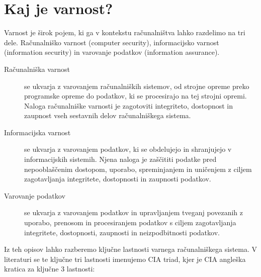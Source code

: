 \documentclass[12pt,a4paper,openany,tikz]{book}
\theoremstyle{plain}
\theoremstyle{definition}
\begin{document}
\section{Kaj je varnost?}
\label{sec:Kaj je varnost?}


Varnost je širok pojem, ki ga v kontekstu računalništva lahko razdelimo na tri dele. Računalniško varnost (computer security), informacijsko varnost (information security) in varovanje podatkov (information assurance).

\begin{description}
	\item[Računalniška varnost] se ukvarja z varovanjem računalniških sistemov, od strojne opreme preko programske opreme do podatkov, ki se procesirajo na tej strojni opremi. Naloga računalniške varnosti je zagotoviti integriteto, dostopnost in zaupnost vseh sestavnih delov računalniškega sistema.

  \item[Informacijska varnost] se ukvarja z varovanjem podatkov, ki se obdelujejo in shranjujejo v informacijskih sistemih. Njena naloga je zaščititi podatke pred nepooblaščenim dostopom, uporabo, spreminjanjem in uničenjem z ciljem zagotavljanja integritete, dostopnosti in zaupnosti podatkov.

  \item[Varovanje podatkov] se ukvarja z varovanjem podatkov in upravljanjem tveganj povezanih z uporabo, prenosom in procesiranjem podatkov s ciljem zagotavljanja integritete, dostopnosti, zaupnosti in neizpodbitnosti podatkov.
\end{description}

Iz teh opisov lahko razberemo ključne lastnosti varnega računalniškega sistema. V literaturi se te ključne tri lastnosti imenujemo CIA triad, kjer je CIA angleška kratica za ključne 3 lastnosti:
\end{document}
